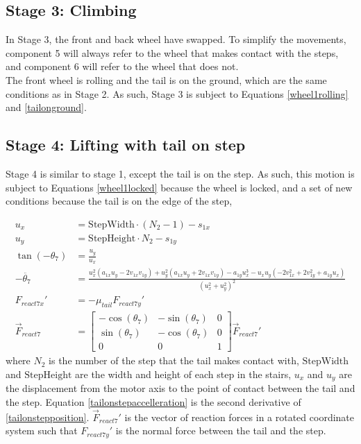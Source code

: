 \subsection*{Stage 3: Climbing}

In Stage 3, the front and back wheel have swapped. To simplify the movements, component 5 will always refer to the wheel that makes contact with the steps, and component 6 will refer to the wheel that does not. \\
The front wheel is rolling and the tail is on the ground, which are the same conditions as in Stage 2. As such, Stage 3 is subject to Equations \ref{wheel1rolling} and \ref{tailonground}.

\subsection*{Stage 4: Lifting with tail on step}
Stage 4 is similar to stage 1, except the tail is on the step. As such, this motion is subject to Equations \ref{wheel1locked} because the wheel is locked, and a set of new conditions because the tail is on the edge of the step,

\begin{subequations}
	\label{tailonstep}
	\begin{align}
		u_x &= \mathrm{StepWidth}\cdot (N_2-1)- s_{1x}\\
		u_y &= \mathrm{StepHeight}\cdot N_2 - s_{1y}\\
		\tan{(-\theta_7)} &= \frac{u_y}{u_x}\\
		\label{tailonstepposition}
		-\ddot{\theta_7} &= \frac{ u_x^2 (a_{1x} u_y  - 2 v_{1x} v_{1y}) 
			+ u_y^2 (a_{1x} u_y + 2  v_{1x}  v_{1y}  )  
			-  a_{1y} u_x^3 
			- u_x  u_y  (- 2  v_{1x}^2 + 2 v_{1y}^2 + a_{1y} u_x  )}
		{(u_x^2 + u_y^2)^2}\\
		\label{tailonstepaccelleration}
		F_{react7x}' &= -\mu_{tail} F_{react7y}'\\
		\vec{F}_{react7} &= \begin{bmatrix}
			-\cos{(\theta_7)} & -\sin{(\theta_7)} & 0\\
			\sin{(\theta_7)} & -\cos{(\theta_7)} & 0\\
			0 & 0 & 1
		\end{bmatrix} \vec{F}_{react7}'
	\end{align}
\end{subequations}
where $N_2$ is the number of the step that the tail makes contact with, $\mathrm{StepWidth}$ and $\mathrm{StepHeight}$ are the width and height of each step in the stairs, $u_x$ and $u_y$ are the displacement from the motor axis to the point of contact between the tail and the step. Equation \ref{tailonstepaccelleration} is the second derivative of \ref{tailonstepposition}. $\vec{F}_{react7}'$ is the vector of reaction forces in a rotated coordinate system such that $F_{react7y}'$ is the normal force between the tail and the step.

